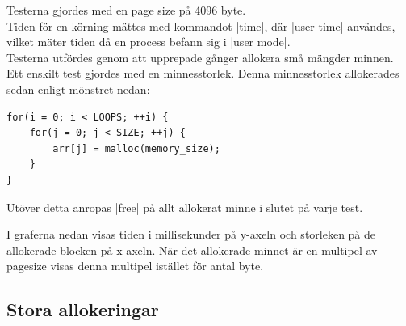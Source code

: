 \documentclass[paper=a4, fontsize=11pt]{scrartcl} %
\numberwithin{equation}{section} %
\numberwithin{figure}{section} %
\numberwithin{table}{section} %
\begin{document}
Testerna gjordes med en page size på 4096 byte.\\

Tiden för en körning mättes med kommandot |time|, där |user time| användes,
vilket mäter tiden då en process befann sig i |user mode|.\\

Testerna utfördes genom att upprepade gånger allokera små mängder minnen.
Ett enskilt test gjordes med en minnesstorlek.
Denna minnesstorlek allokerades sedan enligt mönstret nedan:

\begin{verbatim}
for(i = 0; i < LOOPS; ++i) {
    for(j = 0; j < SIZE; ++j) {
        arr[j] = malloc(memory_size);
    }
}
\end{verbatim}

Utöver detta anropas |free| på allt allokerat minne i slutet på varje test.

I graferna nedan visas tiden i millisekunder på y-axeln och storleken på 
de allokerade blocken på x-axeln. När det allokerade minnet är en multipel
av pagesize visas denna multipel istället för antal byte.

\captionsetup{labelsep=newline}

\subsection{Stora allokeringar}
\end{document}
